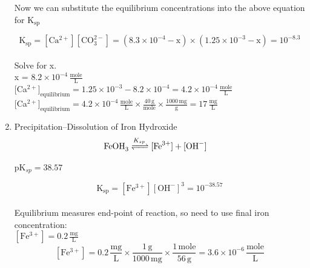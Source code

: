 \documentclass[12pt,letterpaper]{article}
\begin{document}
\begin{enumerate}
\begin{minipage}{\linewidth}
\begin{tabular}{|c|c|c|p{3.1cm}|}
\bottomrule[1.25pt]

\end {tabular}\par
\end{minipage}\\\\

Now we can substitute the equilibrium concentrations into the above equation for K$\mathrm{_{sp}}$

\begin{equation*}
\mathrm{K_{sp} = [Ca^{2+}][CO_3^{2-}]= (8.3\times 10^{-4} - x)\times(1.25\times 10^{-3} -x) = 10^{-8.3}}
\end{equation*}\\

Solve for x. \\

x = $\mathrm{8.2 \times 10^{-4}\, \frac{mole}{L}}$\\

[Ca$\mathrm{^{2+}]_{equilibrium} = 1.25\times 10^{-3} - 8.2 \times 10^{-4} = 4.2 \times 10^{-4}\, \frac{mole}{L}}$\\

[Ca$\mathrm{^{2+}]_{equilibrium}  = 4.2 \times 10^{-4}\, \frac{mole}{L}\times \frac{40\, g}{mole}\times \frac{1000\, mg}{g} = 17\, \frac{mg}{L}}$\\

\vspace{0.2in}

\item  Precipitation--Dissolution of Iron Hydroxide\\

\begin{align*}
\cee{FeOH_3 &<=>[K_{sp}] [Fe^{3+}] + [OH^{-}]} 
\end{align*}

pK$_{sp} = 38.57$

\begin{equation*}
\mathrm{K_{sp} = [Fe^{3+}][OH^{-}]^3=  10^{-38.57}}
\end{equation*}\\

Equilibrium measures end-point of reaction, so need to use final iron concentration:\\

$\mathrm{[Fe^{3+}] = 0.2\, \frac{mg}{L}}$\\

\begin{equation*}
\mathrm{[Fe^{3+}] = 0.2\, \frac{mg}{L}\times \frac{1\, g}{1000\, mg} \times \frac{1\, mole}{56\, g} = 3.6 \times 10^{-6}\, \frac{mole}{L}}
\end{equation*}


\end{enumerate}
\end{document}
